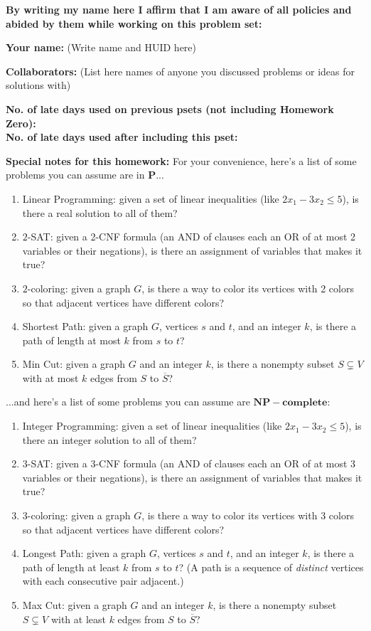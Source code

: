 \documentclass[11pt]{article}
\begin{document}
	\textbf{By writing my name here I affirm that I am aware of all policies
		and abided by them while working on this problem set:}
	
	\textbf{Your name:} (Write name and HUID here)
	
	\textbf{Collaborators:} (List here names of anyone you discussed
	problems or ideas for solutions with)
	
	\textbf{No. of late days used on previous psets (not including Homework Zero): }\\
	\textbf{No. of late days used after including this pset: }
	
	
	\newpage
	

\textbf{Special notes for this homework:}
For your convenience, here's a list of some problems you can assume are in $\mathbf{P}$...
\begin{enumerate}
	\item Linear Programming: given a set of linear inequalities (like $2x_1 - 3x_2 \le 5$), is there a real solution to all of them?
	\item $2$-SAT: given a 2-CNF formula (an AND of clauses each an OR of at most 2 variables or their negations), is there an assignment of variables that makes it true?
	\item $2$-coloring: given a graph $G$, is there a way to color its vertices with 2 colors so that adjacent vertices have different colors?
	\item Shortest Path: given a graph $G$, vertices $s$ and $t$, and an integer $k$, is there a path of length at most $k$ from $s$ to $t$?
	\item Min Cut: given a graph $G$ and an integer $k$, is there a nonempty subset $S \subsetneq V$ with at most $k$ edges from $S$ to $\overline{S}$? 
\end{enumerate}
...and here's a list of some problems you can assume are $\mathbf{NP-complete}$:
\begin{enumerate}
	\item Integer Programming: given a set of linear inequalities (like $2x_1 - 3x_2 \le 5$), is there an integer solution to all of them?
	\item $3$-SAT: given a 3-CNF formula (an AND of clauses each an OR of at most 3 variables or their negations), is there an assignment of variables that makes it true?
	\item $3$-coloring: given a graph $G$, is there a way to color its vertices with 3 colors so that adjacent vertices have different colors?
	\item Longest Path: given a graph $G$, vertices $s$ and $t$, and an integer $k$, is there a path of length at least $k$ from $s$ to $t$? (A path is a sequence of \emph{distinct} vertices with each consecutive pair adjacent.)
	\item Max Cut: given a graph $G$ and an integer $k$, is there a nonempty subset $S \subsetneq V$ with at least $k$ edges from $S$ to $\overline{S}$? 
\end{enumerate}
\end{document}
